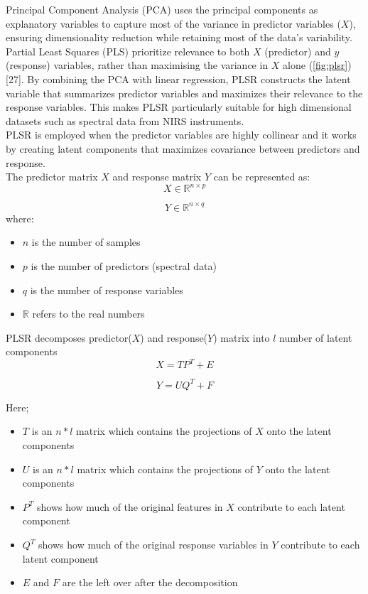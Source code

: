 \documentclass[12pt,a4paper]{report}
\begin{document}
Principal Component Analysis (PCA) uses the principal components as explanatory variables to capture most of the variance in predictor variables ($X$), ensuring dimensionality reduction while retaining most of the data’s variability. 
Partial Least Squares (PLS) prioritize relevance to both $X$ (predictor) and $y$ (response) variables, rather than maximising the variance in $X$ alone (\ref{fig:plsr}) [27]. By combining the PCA with linear regression, PLSR constructs 
the latent variable that summarizes predictor variables and maximizes their relevance to the response variables. This makes PLSR particularly suitable for high dimensional datasets such as spectral data from NIRS instruments. \\

PLSR is employed when the predictor variables are highly collinear and it works by creating latent components that maximizes covariance between predictors and response. \\

The predictor matrix \( X \) and response matrix \( Y \) can be represented as:
\[
X \in \mathbb{R}^{n \times p}
\]

\[
Y \in \mathbb{R}^{n \times q}
\]
where:
\begin{itemize}
    \item \( n \) is the number of samples
    \item \( p \) is the number of predictors (spectral data)
    \item \( q \) is the number of response variables
    \item $\mathbb{R}$ refers to the real numbers
\end{itemize}

PLSR decomposes predictor($X$) and response($Y$) matrix into $l$ number of latent components\\

\[
X = T P^T + E
\]

\[
Y = U Q^T + F
\]

Here;
\begin{itemize}
    \item $T$ is an $n*l$ matrix which contains the projections of $X$ onto the latent components
    \item $U$ is an $n*l$ matrix which contains the projections of $Y$ onto the latent components
    \item $P^T$ shows how much of the original features in $X$ contribute to each latent component
    \item $Q^T$ shows how much of the original response variables in $Y$ contribute to each latent component
    \item $E$ and $F$ are the left over after the decomposition
\end{itemize}
\end{document}
